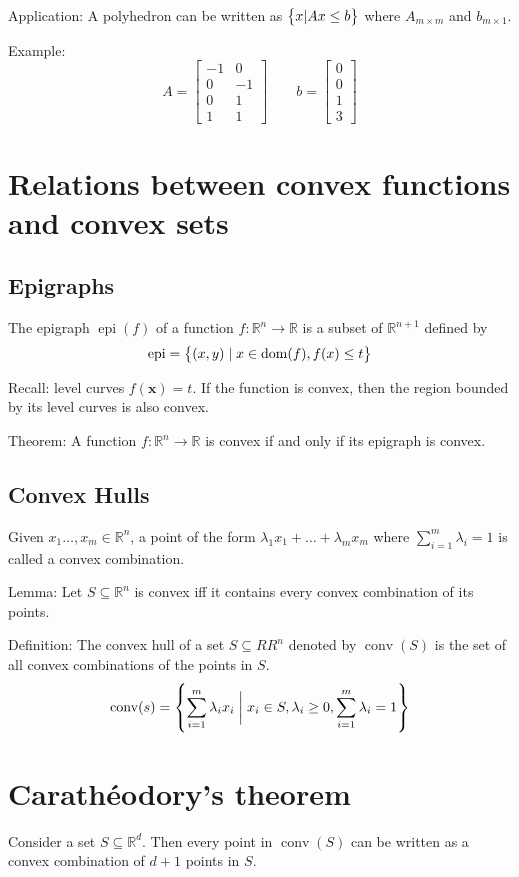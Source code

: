\documentclass{article}
\newcommand{\m}[1]{\begin{bmatrix} #1 \end{bmatrix}}
\newcommand{\RR}{\mathbb{R}}
\begin{document}
Application: A polyhedron can be written as \(\set{x | Ax \leq b}\) where \(A_{m \times m}\) and \(b_{m \times 1}\).

Example:
\[A = \m{-1 & 0 \\ 0 & -1\\ 0 & 1\\ 1 & 1}\qquad b = \m{0\\0\\1\\3}\]

\section{Relations between convex functions and convex sets}
\subsection{Epigraphs}
The epigraph \(\mathop{\mathrm{epi}}(f)\) of a function \(f: \RR^n \to \RR\) is a subset of \(\RR^{n+1}\) defined by
\[\mathop{\mathrm{epi}} = \set{(x, y) \mid x \in \mathop{\mathrm{dom}}(f), f(x) \leq t}\]

Recall: level curves \(f(\bm x) = t\). If the function is convex, then the region bounded by its level curves is also convex.

Theorem: A function \(f: \RR^n \to \RR\) is convex if and only if its epigraph is convex.

\subsection{Convex Hulls}
Given \(x_1 \dots, x_m \in \RR^n\), a point of the form \(\lambda_1x_1 + \dots+ \lambda_m x_m\) where \(\sum_{i=1}^m \lambda_i = 1\) is called a convex combination.

Lemma: Let \(S \subseteq \RR^n\) is convex iff it contains every convex combination of its points.

Definition: The convex hull of a set \(S \subseteq RR^n\) denoted by \(\mathop{\mathrm{conv}}(S)\) is the set of all convex combinations of the points in \(S\).
\[\mathop{\mathrm{conv}}(s) = \set{\sum_{i = 1}^m\lambda_i x_i\mathrel{\bigg|} x_i \in S, \lambda_i \geq 0, \sum_{i = 1}^m \lambda_i = 1}\]

\section{Carath\'eodory's theorem}
Consider a set \(S \subseteq \RR^d\).
Then every point in \(\mathop{\mathrm{conv}}(S)\) can be written as a convex combination of \(d+1\) points in \(S\).
\end{document}
